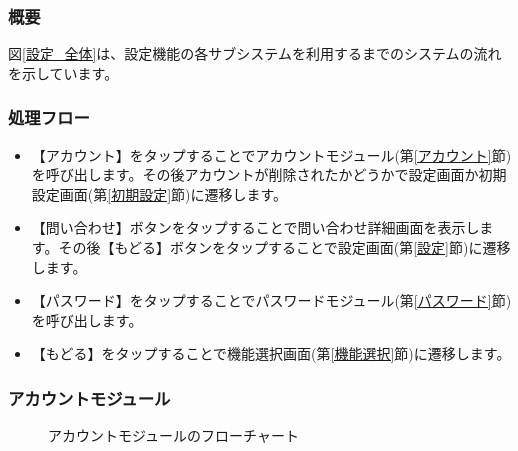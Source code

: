 \documentclass[a4j]{jarticle}
\begin{document}
\subsubsection*{概要}
図\ref{設定_全体}は、設定機能の各サブシステムを利用するまでのシステムの流れを示しています。
\subsubsection*{処理フロー}
\begin{itemize}
\item 【アカウント】をタップすることでアカウントモジュール(第\ref{アカウント}節)を呼び出します。その後アカウントが削除されたかどうかで設定画面か初期設定画面(第\ref{初期設定}節)に遷移します。

\item 【問い合わせ】ボタンをタップすることで問い合わせ詳細画面を表示します。その後【もどる】ボタンをタップすることで設定画面(第\ref{設定}節)に遷移します。

\item 【パスワード】をタップすることでパスワードモジュール(第\ref{パスワード}節)を呼び出します。

\item 【もどる】をタップすることで機能選択画面(第\ref{機能選択}節)に遷移します。
\end{itemize}

\subsubsection{アカウントモジュール\label{アカウント}} %
\begin{figure}[H]
    \begin{center}
    \caption {アカウントモジュールのフローチャート}
    \label{設定_アカウント}
    \end{center}
\end{figure}
\end{document}
